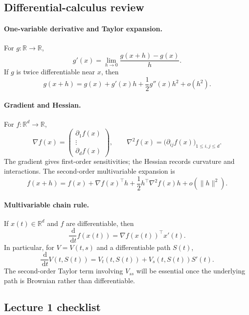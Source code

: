 \documentclass[11pt]{article}
\newcommand{\R}{\mathbb{R}}
\newcommand{\dd}{\,\mathrm{d}}
\newcommand{\1}{\mathbf{1}}
\theoremstyle{plain}
\theoremstyle{definition}
\theoremstyle{remark}
\begin{document}
\subsection{Differential-calculus review}

\paragraph{One-variable derivative and Taylor expansion.}
For $g:\R\to\R$,
\[
g'(x)=\lim_{h\to0}\frac{g(x+h)-g(x)}{h}.
\]
If $g$ is twice differentiable near $x$, then
\[
g(x+h)=g(x)+g'(x)h+\frac12g''(x)h^2+o(h^2).
\]

\paragraph{Gradient and Hessian.}
For $f:\R^d\to\R$,
\[
\nabla f(x)=
\begin{pmatrix}
\partial_1f(x)\\ \vdots\\ \partial_df(x)
\end{pmatrix},
\qquad
\nabla^2f(x)=\bigl(\partial_{ij}f(x)\bigr)_{1\le i,j\le d}.
\]
The gradient gives first-order sensitivities; the Hessian records curvature
and interactions. The second-order multivariable expansion is
\[
f(x+h)=f(x)+\nabla f(x)^\top h
+\frac12h^\top\nabla^2f(x)h+o(\|h\|^2).
\]

\paragraph{Multivariable chain rule.}
If $x(t)\in\R^d$ and $f$ are differentiable, then
\[
\frac{\dd}{\dd t}f(x(t))
=\nabla f(x(t))^\top x'(t).
\]
In particular, for $V=V(t,s)$ and a differentiable path $S(t)$,
\[
\frac{\dd}{\dd t}V(t,S(t))
=V_t(t,S(t))+V_s(t,S(t))S'(t).
\]
The second-order Taylor term involving $V_{ss}$ will be essential once the
underlying path is Brownian rather than differentiable.

\subsection*{Lecture 1 checklist}
\end{document}
